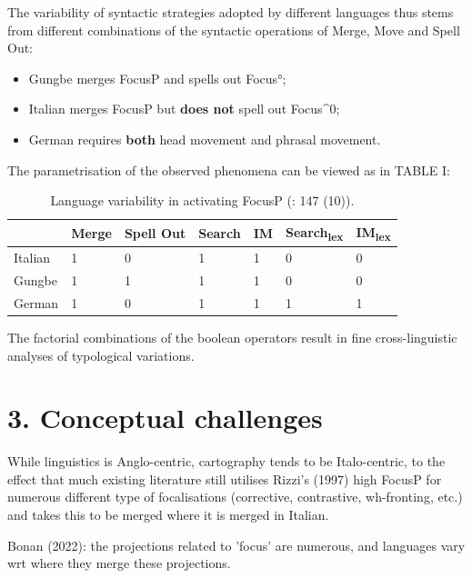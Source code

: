 \documentclass[fleqn,10pt]{wlscirep}
\begin{document}
\noindent The variability of syntactic strategies adopted by different languages thus stems from different combinations of the syntactic operations of Merge, Move and Spell Out: 

\begin{itemize}
\item Gungbe merges FocusP and spells out Focus°; 
\item \vspace*{-2mm} Italian merges FocusP but \textbf{does not} spell out Focus^0; 
\item \vspace*{-2mm} German requires \textbf{both} head movement and phrasal movement. 
\end{itemize}

\noindent The parametrisation of the observed phenomena can be viewed as in TABLE I:

\begin{table}[H]
    \centering
    \begin{tabular}{|l|l|l|l|l|l|l|}
    \hline
     & Merge & Spell Out & Search & IM & Search\textsubscript{lex} & IM\textsubscript{lex} \\
    \hline
    Italian & 1 & 0 & 1 & 1 & 0 & 0 \\
    \hline
    Gungbe & 1 & 1 & 1 & 1 & 0 & 0 \\
    \hline
    German & 1 & 0 & 1 & 1 & 1 & 1 \\
    \hline
    \end{tabular}
    \caption{\label{tab:samp}Language variability in activating FocusP (\citealt{samo2019cartography}: 147 (10)).}
    \end{table}

\noindent The factorial combinations of the boolean operators result in fine cross-linguistic analyses of typological variations.

\section*{3. Conceptual challenges}

While linguistics is Anglo-centric, cartography tends to be Italo-centric, to the effect that much existing literature still utilises Rizzi's (1997) high FocusP for numerous different type of focalisations (corrective, contrastive, wh-fronting, etc.) and takes this to be merged where it is merged in Italian. 

\noindent Bonan (2022): the projections related to 'focus' are numerous, and languages vary wrt where they merge these projections.
\end{document}
